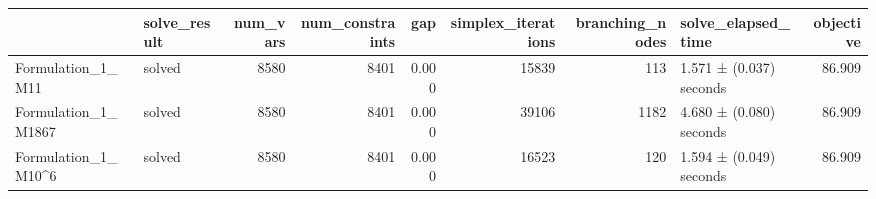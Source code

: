 \begin{tabular}{llrrrrrlr}
\toprule
 & solve_result & num_vars & num_constraints & gap & simplex_iterations & branching_nodes & solve_elapsed_time & objective \\
\midrule
Formulation_1_M11 & solved & 8580 & 8401 & 0.000 & 15839 & 113 & 1.571 ± (0.037) seconds & 86.909 \\
Formulation_1_M1867 & solved & 8580 & 8401 & 0.000 & 39106 & 1182 & 4.680 ± (0.080) seconds & 86.909 \\
Formulation_1_M10^6 & solved & 8580 & 8401 & 0.000 & 16523 & 120 & 1.594 ± (0.049) seconds & 86.909 \\
\bottomrule
\end{tabular}
